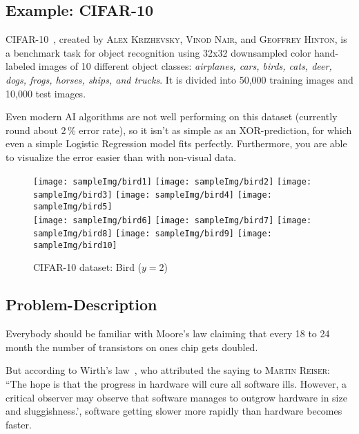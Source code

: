 \documentclass[dvipsnames,twocolumn]{scrartcl}
\begin{document}
	\subsection{Example: CIFAR-10}
	
	CIFAR-10~\cite{cifar-10}, created by \textsc{Alex Krizhevsky}, \textsc{Vinod Nair}, and \textsc{Geoffrey Hinton}, is a benchmark task for object recognition using 32x32 downsampled color hand-labeled images of 10 different object classes: \emph{airplanes, cars, birds, cats, deer, dogs, frogs, horses, ships, and trucks}. It is divided into 50,000 training images and 10,000 test images.
	
	Even modern AI algorithms are not well performing on this dataset (currently round about 2\,\% error rate), so it isn't as simple as an XOR-prediction, for which even a simple Logistic Regression model fits perfectly. Furthermore, you are able to visualize the error easier than with non-visual data.
	
	\begin{figure}
		\caption{CIFAR-10 dataset: Bird ($y=2$)}
		\texttt{[image: sampleImg/bird1]}%
		\texttt{[image: sampleImg/bird2]}%
		\texttt{[image: sampleImg/bird3]}%
		\texttt{[image: sampleImg/bird4]}%
		\texttt{[image: sampleImg/bird5]}\\%
		\texttt{[image: sampleImg/bird6]}%
		\texttt{[image: sampleImg/bird7]}%
		\texttt{[image: sampleImg/bird8]}%
		\texttt{[image: sampleImg/bird9]}%
		\texttt{[image: sampleImg/bird10]}
	\end{figure}
	
	\subsection{Problem-Description}
	
	Everybody should be familiar with Moore's law claiming that every 18 to 24 month the number of transistors on ones chip gets doubled.
	
	But according to Wirth's law~\cite{wirth}, who attributed the saying to \textsc{Martin Reiser}: ``The hope is that the progress in hardware will cure all software ills. However, a critical observer may observe that software manages to outgrow hardware in size and sluggishness.', software getting slower more rapidly than hardware becomes faster.
	
\end{document}
